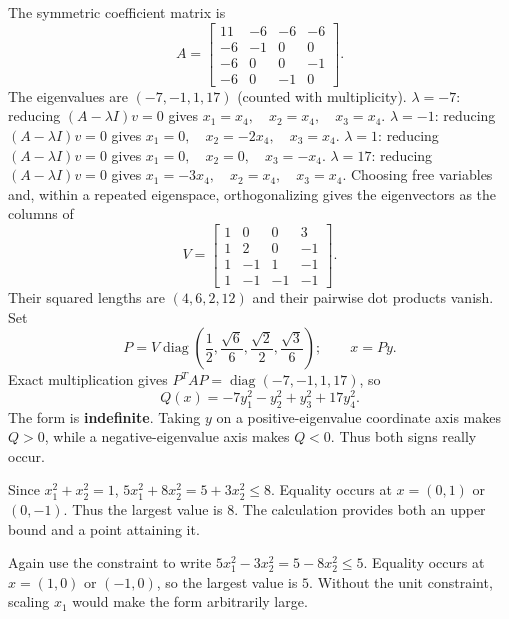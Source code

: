 The symmetric coefficient matrix is
\[
 A=\begin{bmatrix}11&-6&-6&-6\\-6&-1&0&0\\-6&0&0&-1\\-6&0&-1&0\end{bmatrix}.
\]
The eigenvalues are $(-7,-1,1,17)$ (counted with multiplicity).
$\lambda=-7$: reducing $(A-\lambda I)v=0$ gives
\( x_{1}=x_{4},\quad x_{2}=x_{4},\quad x_{3}=x_{4} \).
$\lambda=-1$: reducing $(A-\lambda I)v=0$ gives
\( x_{1}=0,\quad x_{2}=- 2 x_{4},\quad x_{3}=x_{4} \).
$\lambda=1$: reducing $(A-\lambda I)v=0$ gives
\( x_{1}=0,\quad x_{2}=0,\quad x_{3}=- x_{4} \).
$\lambda=17$: reducing $(A-\lambda I)v=0$ gives
\( x_{1}=- 3 x_{4},\quad x_{2}=x_{4},\quad x_{3}=x_{4} \).
Choosing free variables and, within a repeated eigenspace, orthogonalizing
gives the eigenvectors as the columns of
\[
 V=\begin{bmatrix}1&0&0&3\\1&2&0&-1\\1&-1&1&-1\\1&-1&-1&-1\end{bmatrix}.
\]
Their squared lengths are $(4,6,2,12)$ and their pairwise dot products vanish. Set
\[
 P=V\operatorname{diag}(\frac{1}{2},\frac{\sqrt{6}}{6},\frac{\sqrt{2}}{2},\frac{\sqrt{3}}{6});\qquad x=Py.
\]
Exact multiplication gives $P^TAP=\operatorname{diag}(-7,-1,1,17)$, so
\[
 Q(x)=\boxed{- 7 y_{1}^{2} - y_{2}^{2} + y_{3}^{2} + 17 y_{4}^{2}}.
\]
The form is \textbf{indefinite}. Taking $y$ on a positive-eigenvalue coordinate axis makes $Q>0$,
while a negative-eigenvalue axis makes $Q<0$. Thus both signs really occur.

Since $x_1^2+x_2^2=1$,
$5x_1^2+8x_2^2=5+3x_2^2\le8$.
Equality occurs at $x=(0,1)$ or $(0,-1)$. Thus the largest value is
$\boxed8$. The calculation provides both an upper bound and a point attaining it.

Again use the constraint to write
$5x_1^2-3x_2^2=5-8x_2^2\le5$.
Equality occurs at $x=(1,0)$ or $(-1,0)$, so the largest value is
$\boxed5$. Without the unit constraint, scaling $x_1$ would make the
form arbitrarily large.

